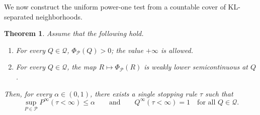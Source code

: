 \documentclass[11pt]{article}
\newcommand{\Pcal}{\mathcal{P}}
\newcommand{\Qcal}{\mathcal{Q}}
\newtheorem{theorem}{Theorem}[section]
\theoremstyle{definition}
\theoremstyle{definition}
\begin{document}
We now construct the uniform power-one test from a countable cover of KL-separated neighborhoods.



\begin{theorem}\label{thm:mainy}
Assume that the following hold.
\begin{enumerate}
    \item For every $Q\in\Qcal$, $\Phi_\Pcal(Q)>0$; the value $+\infty$ is allowed.
    \item For every $Q\in\Qcal$, the map $R\mapsto \Phi_\Pcal(R)$ is weakly lower semicontinuous at $Q$.
\end{enumerate}
Then, for every $\alpha\in(0,1)$, there exists a single stopping rule $\tau$ such that
\[
  \sup_{P\in\Pcal}P^\infty(\tau<\infty)\le\alpha
  \qquad\text{and}\qquad
  Q^\infty(\tau<\infty)=1\quad\text{for all }Q\in\Qcal.
\]
\end{theorem}
\end{document}
